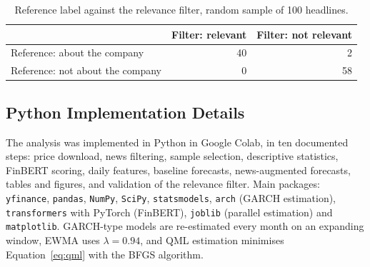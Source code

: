 \documentclass[12pt,a4paper]{article}
\begin{document}
\begin{table}[htbp]
  \centering\small
  \caption[Validation of the relevance filter]{Reference label against the relevance filter, random sample of 100 headlines.}
  \label{tab:confusion}
  \begin{tabular}{lrr}
    \toprule
     & Filter: relevant & Filter: not relevant \\
    \midrule
    Reference: about the company & 40 & 2 \\
    Reference: not about the company & 0 & 58 \\
    \bottomrule
  \end{tabular}
\end{table}

\endgroup
\subsection{Python Implementation Details}\label{sec:appendix-python}
The analysis was implemented in Python in Google Colab, in ten documented steps: price download, news filtering, sample selection, descriptive statistics, FinBERT scoring, daily features, baseline forecasts, news-augmented forecasts, tables and figures, and validation of the relevance filter. Main packages: \texttt{yfinance}, \texttt{pandas}, \texttt{NumPy}, \texttt{SciPy}, \texttt{statsmodels}, \texttt{arch} (GARCH estimation), \texttt{transformers} with PyTorch (FinBERT), \texttt{joblib} (parallel estimation) and \texttt{matplotlib}. GARCH-type models are re-estimated every month on an expanding window, EWMA uses $\lambda = 0.94$, and QML estimation minimises Equation~\eqref{eq:qml} with the BFGS algorithm.
\end{document}

